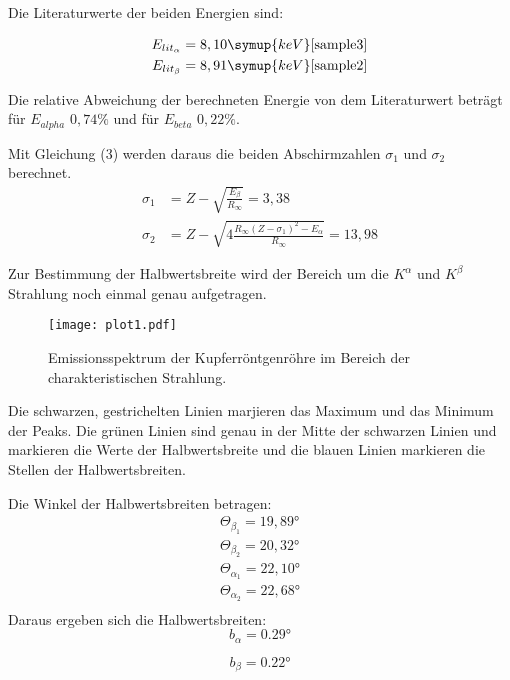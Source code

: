 Die Literaturwerte der beiden Energien sind:

\begin{align*}
  E_{lit_{\alpha}} &= 8,10 \symup{keV} \text{\cite{sample3}} \\
  E_{lit_{\beta}} &= 8,91 \symup{keV} \text{\cite{sample2}}
\end{align*}

Die relative Abweichung der berechneten Energie von dem Literaturwert beträgt für $E_{alpha}$ $0,74 \%$ und für
$E_{beta}$ $0,22 \%$.

Mit Gleichung (3) werden daraus die beiden Abschirmzahlen $\sigma_1$ und $\sigma_2$ berechnet.
\begin{align*}
  \sigma_1 &= Z - \sqrt{\frac{E_{\beta}}{R_{\infty}}} = 3,38 \\
  \sigma_2 &= Z - \sqrt{4 \frac{R_{\infty} (Z-\sigma_1)^2 - E_{\alpha}}{R_{\infty}}} = 13,98
\end{align*}

Zur Bestimmung der Halbwertsbreite wird der Bereich um die $K^{\alpha}$ und $K^{\beta}$ Strahlung
noch einmal genau aufgetragen.

\begin{figure}
  \centering
  \texttt{[image: plot1.pdf]}
  \caption{Emissionsspektrum der Kupferröntgenröhre im Bereich der charakteristischen Strahlung.}
  \label{fig:plot1}
\end{figure}

Die schwarzen, gestrichelten Linien marjieren das Maximum und das Minimum der Peaks. Die grünen Linien sind genau in der Mitte der
schwarzen Linien und markieren die Werte der Halbwertsbreite und die blauen Linien markieren die Stellen der Halbwertsbreiten.

Die Winkel der Halbwertsbreiten betragen:
\begin{align*}
  \Theta_{\beta_1} = 19,89° \\
  \Theta_{\beta_2} = 20,32° \\
  \Theta_{\alpha_1} = 22,10° \\
  \Theta_{\alpha_2} = 22,68° \\
\end{align*}
Daraus ergeben sich die Halbwertsbreiten:
\begin{equation*}
  b_{\alpha} = 0.29°
\end{equation*}

\begin{equation*}
  b_{\beta} = 0.22°
\end{equation*}



